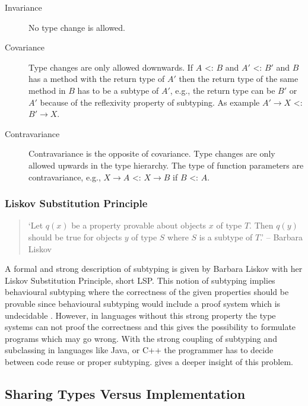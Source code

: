 \begin{description}
	\item[Invariance] No type change is allowed.
	\item[Covariance] Type changes are only allowed downwards. If $A$
	<: $B$ and $A'$ <: $B'$ and $B$ has a method with the return
	type of $A'$ then the return type of the same method in $B$
	has to be a subtype of $A'$, e.g., the return type can be $B'$
	or $A'$ because of the reflexivity property of subtyping. As
	example $A' \rightarrow X$ <: $B' \rightarrow X$.
	\item[Contravariance] Contravariance is the opposite of
	covariance. Type changes are only allowed upwards in the type
	hierarchy. The type of function parameters are contravariance,
	e.g., $X \rightarrow A$ <: $X \rightarrow B$ if $B$ <: $A$.
\end{description}

\subsubsection{Liskov Substitution Principle}
\begin{quotation}
`Let $q(x)$ be a property provable about objects $x$ of type $T$. Then
$q(y)$ should be true for objects $y$ of type $S$ where $S$ is a subtype
of $T$.' -- Barbara Liskov \cite{liskov_behavioral_1999}
\end{quotation}

A formal and strong description of subtyping is given by Barbara
Liskov with her Liskov Substitution Principle, short LSP. This notion
of subtyping implies behavioural subtyping where the correctness
of the given properties should be provable since behavioural
subtyping would include a proof system which is undecidable
\cite{poll_behavioural_1998}. However, in languages without this strong
property the type systems can not proof the correctness and this gives
the possibility to formulate programs which may go wrong. 
With the
strong coupling of subtyping and subclassing in languages like Java,
\cs or C++ the programmer has to decide between code reuse or proper
subtyping.  gives a deeper insight of this
problem.

\subsection{Sharing Types Versus Implementation}
\label{sec:sharingTypes}

